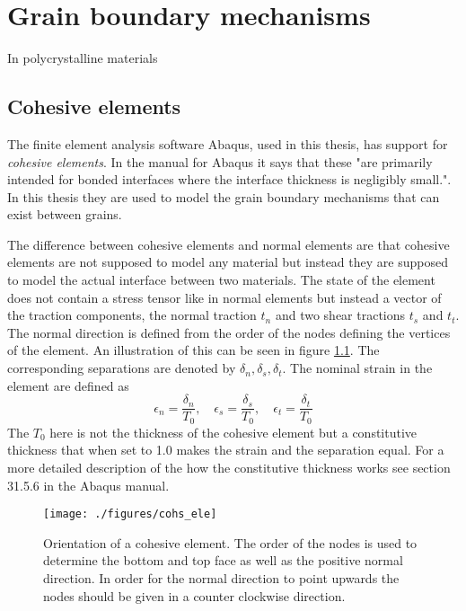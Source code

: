 \documentclass[grain_boundary_law.tex]{subfiles}
\begin{document}
\chapter{Grain boundary mechanisms}


In polycrystalline materials \cite[p. 11]{Buss04}

\section{Cohesive elements}

The finite element analysis software Abaqus, used in this thesis, has support for \textit{cohesive elements}. In the manual for Abaqus it says that these "are primarily intended for bonded interfaces where the interface thickness is negligibly small.". In this thesis they are used to model the grain boundary mechanisms that can exist between grains.

The difference between cohesive elements and normal elements are that cohesive elements are not supposed to model any material but instead they are supposed to model the actual interface between two materials. The state of the element does not contain a stress tensor like in normal elements but instead a vector of the traction components, the normal traction $t_n$ and two shear tractions $t_s$ and $t_t$. The normal direction is defined from the order of the nodes defining the vertices of the element. An illustration of this can be seen in figure \ref{fig:cohs_ori}. The corresponding separations are denoted by $\delta_n, \delta_s, \delta_t$. The nominal strain in the element are defined as
%
\[ \epsilon_n = \frac{\delta_n}{T_0}, \quad \epsilon_s = \frac{\delta_s}{T_0}, \quad \epsilon_t = \frac{\delta_t}{T_0}  \]
%
The $T_0$ here is not the thickness of the cohesive element but a constitutive thickness that when set to 1.0 makes the strain and the separation equal. For a more detailed description of the how the constitutive thickness works see section 31.5.6 in the Abaqus manual.



\begin{figure}
\centering
 \texttt{[image: ./figures/cohs\_ele]}
\caption{Orientation of a cohesive element. The order of the nodes is used to determine the bottom and top face as well as the positive normal direction. In order for the normal direction to point upwards the nodes should be given in a counter clockwise direction.}
\label{fig:cohs_ori}
\end{figure}
\end{document}
